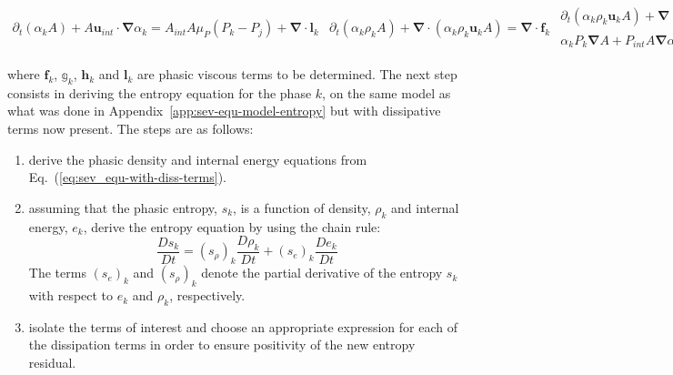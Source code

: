 \documentclass[preprint,10pt]{elsarticle}
\renewcommand{\div}{\mbold{\nabla}\! \cdot \!}
\newcommand{\grad}{\mbold{\nabla}}
\newcommand{\mbold}[1]{\boldsymbol#1}
\newcommand{\eqt}[1]{Eq.~(\ref{#1})}                     %
\newcommand{\app}[1]{Appendix~\ref{#1}}                   %
\begin{document}
\begin{subequations}\label{eq:sev_equ-with-diss-terms}
\begin{align}\label{eq:sev_equ-with-diss-terms-vf}
\partial_t \left( \alpha_k  A\right) + A \mbold u_{int} \cdot \grad \alpha_k = A_{int} A \mu_P \left( P_k - P_j \right) + \div \mbold l_k
\end{align}
\begin{align}\label{eq:sev_equ-with-diss-terms-cont}
\partial_t \left( \alpha_k \rho_k A \right) + \div \left( \alpha_k \rho_k \mbold u_k A \right) = \div \mbold f_k
\end{align}
\begin{multline}\label{eq:sev_equ-with-diss-terms-mom}
\partial_t \left( \alpha_k \rho_k \mbold u_k A \right) + \div \left[ \alpha_k A \left( \rho_k \mbold u_k \otimes \mbold u_k + P_k \mathbb{I} \right) \right] =\\
\alpha_k P_k \grad A + P_{int} A \grad \alpha_k + A \lambda_u \left( \mbold u_j - \mbold u_k \right) + \div \mathbb{g}_k
\end{multline}
\begin{multline}\label{eq:sev_equ-with-diss-terms-ener}
\partial_t \left( \alpha_k \rho_k E_k A \right) + \div \left[ \alpha_k A \mbold u_k \left( \rho_k E_k + P_k \right) \right] = \\
P_{int} A \mbold u_{int} \cdot \grad \alpha_k -
\mu_P A  \bar{P}_{int} \left( P_k-P_j \right) + \\
A \lambda_u \bar{\mbold u}_{int} \cdot \left( \mbold u_j - \mbold u_k \right)
+ \div \left( \mbold h_k + \mbold u \cdot \mathbb{g}_k \right)
\end{multline}
\end{subequations}
%
where $\mbold f_k$, $\mathbb{g}_k$, $\mbold h_k$ and $\mbold l_k$ are phasic viscous terms to be determined. The next step consists in deriving the entropy equation for the phase $k$, on the same model as what was done in \app{app:sev-equ-model-entropy} but with dissipative terms now present. The steps are as follows:
%
\begin{enumerate}
\item derive the phasic density and internal energy equations from \eqt{eq:sev_equ-with-diss-terms}.
\item assuming that the phasic entropy, $s_k$, is a function of density, $\rho_k$ and internal energy, $e_k$, derive the entropy equation by using the chain rule:
\begin{equation}
\label{eq:chain_rule-sct4}
\frac{Ds_k}{Dt} = \left( s_{\rho} \right)_k \frac{D \rho_k}{Dt} + \left( s_{e} \right)_k \frac{D e_k}{Dt} 
\end{equation}
The terms $(s_e)_k$ and $(s_{\rho})_k$ denote the partial derivative of the entropy $s_k$ with respect to $e_k$ and $\rho_k$, respectively.
\item isolate the terms of interest and choose an appropriate expression for each of the dissipation terms in order to ensure positivity of the new entropy residual.
\end{enumerate}
\end{document}
